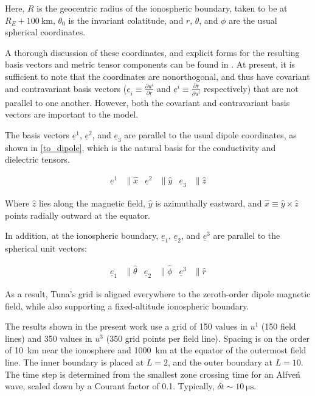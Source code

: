 \documentclass[draft,linenumbers]{agujournal}
\begin{document}
Here, $R$ is the geocentric radius of the ionospheric boundary, taken to be at $R_E + \SI{100}{\km}$, $\theta_0$ is the invariant colatitude, and $r$, $\theta$, and $\phi$ are the usual spherical coordinates.

A thorough discussion of these coordinates, and explicit forms for the resulting basis vectors and metric tensor components can be found in \citet{lysak_2004}. At present, it is sufficient to note that the coordinates are nonorthogonal, and thus have covariant and contravariant basis vectors (${\underline{e}_i \equiv \frac{\partial u^i}{\partial \underline{r}}}$ and ${\underline{e}^i \equiv \frac{\partial \underline{r}}{\partial u^i}}$ respectively) that are not parallel to one another. However, both the covariant and contravariant basis vectors are important to the model.

The basis vectors $\underline{e}^1$, $\underline{e}^2$, and $\underline{e}_3$ are parallel to the usual dipole coordinates, as shown in \cref{to_dipole}, which is the natural basis for the conductivity and dielectric tensors.
\begin{linenomath*}
\begin{align}
    \label{to_dipole}
    \underline{e}^1 &\parallel \hat{x} &
    \underline{e}^2 &\parallel \hat{y} &
    \underline{e}_3 &\parallel \hat{z}
\end{align}
\end{linenomath*}

Where $\hat{z}$ lies along the magnetic field, $\hat{y}$ is azimuthally eastward, and $\hat{x} \equiv \hat{y} \times \hat{z}$ points radially outward at the equator.

In addition, at the ionospheric boundary, $\underline{e}_1$, $\underline{e}_2$, and $\underline{e}^3$ are parallel to the spherical unit vectors:
\begin{linenomath*}
\begin{align}
  \underline{e}_1 &\parallel \hat{\theta} &
  \underline{e}_2 &\parallel \hat{\phi} &
  \underline{e}^3 &\parallel \hat{r}
\end{align}
\end{linenomath*}


As a result, Tuna's grid is aligned everywhere to the zeroth-order dipole magnetic field, while also supporting a fixed-altitude ionospheric boundary.

The results shown in the present work use a grid of 150 values in $u^1$ (150 field lines) and 350 values in $u^3$ (350 grid points per field line). Spacing is on the order of \SI{10}{\km} near the ionosphere and \SI{1000}{\km} at the equator of the outermost field line. The inner boundary is placed at $L = 2$, and the outer boundary at $L = 10$. The time step is determined from the smallest zone crossing time for an Alfve\'n wave, scaled down by a Courant factor of \num{0.1}. Typically, $\delta \! t \sim \SI{10}{\us}$.
\end{document}
